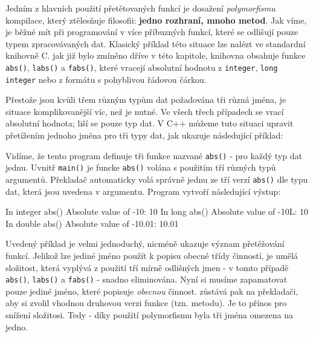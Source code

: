       Jedním z hlavních použití přetětovaných funkcí je dosažení \emph{polymorfismu} kompilace,
      který ztělesňuje filosofii: \textbf{jedno rozhraní, mnoho metod}. Jak víme, je běžné mít při
      programování v  více příbuzných funkcí, které se odlišují pouze typem zpracovávaných
      dat. Klasický příklad této situace lze nalézt ve standardní knihovně C. jak již bylo zmíněno
      dříve v této kapitole, knihovna obsahuje funkce \lstinline[style=luaCPPText]!abs()!,
      \lstinline[style=luaCPPText]!labs()! a \lstinline[style=luaCPPText]!fabs()!, které vracejí
      absolutní hodnotu z \lstinline[style=luaCPPText]!integer!,
      \lstinline[style=luaCPPText]!long integer! nebo z formátu s pohyblivou řádovou čárkou. 

      Přestože jsou kvůli třem různým typům dat požadována tři různá jména, je situace 
      komplikovanější víc, než je nutné. Ve všech třech případech se vrací absolutní hodnota; liší
      se pouze typ dat. V C++ můžeme tuto situaci upravit přetížením jednoho jména pro tři typy dat,
      jak ukazuje následující příklad:  
      
      Vidíme, že tento program definuje tři funkce nazvané \lstinline[style=luaCPPText]!abs()! - pro
      každý typ dat jednu. Uvnitř \lstinline[style=luaCPPText]!main()! je funcke
      \lstinline[style=luaCPPText]!abs()! volána s použitím tří různých typů argumentů.
      Překladač automaticky volá správně jednu ze tří verzí \lstinline[style=luaCPPText]!abs()! dle
      typu dat, která jsou uvedena v argumentu. Program vytvoří následující výstup:
      \begin{mdframed}[style=mdmsdos]
        In integer abs()\newline
        Absolute value of -10: 10\newline\vspace{1em}  
        In long abs()   \newline
        Absolute value of -10L: 10\newline\vspace{1em}  
        In double abs() \newline
        Absolute value of -10.01: 10.01
      \end{mdframed}

      Uvedený příklad je velmi jednoduchý, nicméně ukazuje význam přetěžování funkcí. Jelikož lze
      jediné jméno použít k popisu obecné třídy činností, je umělá složitost, která vyplývá z
      použití tří mírně odlišných jmen - v tomto případě \lstinline[style=luaCPPText]!abs()!,
      \lstinline[style=luaCPPText]!labs()! a \lstinline[style=luaCPPText]!fabs()! - snadno
      eliminována. Nyní si musíme zapamatovat pouze jediné jméno, které popisuje \emph{obecnou}
      činnost. zůstává pak na překladači, aby si zvolil vhodnou druhovou verzi funkce (tzn. metodu).
      Je to přínos pro snížení složitosi. Tedy - díky použití polymorfismu byla tři jména omezena na
      jedno. 

